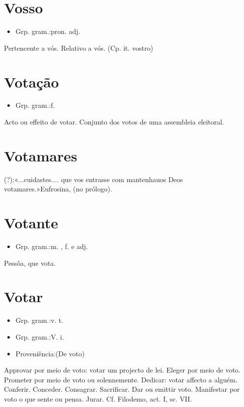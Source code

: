 \documentclass{article}
\begin{document}
\section{Vosso}
\begin{itemize}
\item {Grp. gram.:pron. adj.}
\end{itemize}
Pertencente a vós.
Relativo a vós.
(Cp. it. \textunderscore vostro\textunderscore )
\section{Votação}
\begin{itemize}
\item {Grp. gram.:f.}
\end{itemize}
Acto ou effeito de votar.
Conjunto dos votos de uma assembleia eleitoral.
\section{Votamares}
(?):«\textunderscore ...cuidastes.... que vos entrasse com mantenhauos Deos votamares.\textunderscore »\textunderscore Eufrosina\textunderscore , (no prólogo).
\section{Votante}
\begin{itemize}
\item {Grp. gram.:m. ,  f.  e  adj.}
\end{itemize}
Pessôa, que vota.
\section{Votar}
\begin{itemize}
\item {Grp. gram.:v. t.}
\end{itemize}
\begin{itemize}
\item {Grp. gram.:V. i.}
\end{itemize}
\begin{itemize}
\item {Proveniência:(De \textunderscore voto\textunderscore )}
\end{itemize}
Approvar por meio de voto: \textunderscore votar um projecto de lei\textunderscore .
Eleger por meio de voto.
Prometer por meio de voto ou solennemente.
Dedicar: \textunderscore votar affecto a alguém\textunderscore .
Conferir.
Conceder.
Consagrar.
Sacrificar.
Dar ou emittir voto.
Manifestar por voto o que sente ou pensa.
Jurar. Cf. \textunderscore Filodemo\textunderscore , act. I, sc. VII.
\end{document}

